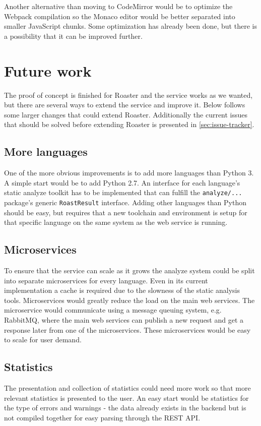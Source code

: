 \documentclass[12pt,a4paper]{report}
\begin{document}
Another alternative than moving to CodeMirror would be to optimize the Webpack compilation so the Monaco editor would be better separated into smaller JavaScript chunks. Some optimization has already been done, but there is a possibility that it can be improved further.

\chapter{Future work}
\label{sec:future-work}
The proof of concept is finished for Roaster and the service works as we wanted, but there are several ways to extend the service and improve it. Below follows some larger changes that could extend Roaster. Additionally the current issues that should be solved before extending Roaster is presented in \autoref{sec:issue-tracker}.

\section{More languages}
One of the more obvious improvements is to add more languages than Python 3. A simple start would be to add Python 2.7. An interface for each language's static analyze toolkit has to be implemented that can fulfill the \texttt{analyze/...} package's generic \texttt{RoastResult} interface. Adding other languages than Python should be easy, but requires that a new toolchain and environment is setup for that specific language on the same system as the web service is running.

\section{Microservices}
To ensure that the service can scale as it grows the analyze system could be split into separate microservices for every language. Even in its current implementation a cache is required due to the slowness of the static analysis tools. Microservices would greatly reduce the load on the main web services. The microservice would communicate using a message queuing system, e.g. RabbitMQ, where the main web services can publish a new request and get a response later from one of the microservices. These microservices would be easy to scale for user demand.

\section{Statistics}
The presentation and collection of statistics could need more work so that more relevant statistics is presented to the user. An easy start would be statistics for the type of errors and warnings - the data already exists in the backend but is not compiled together for easy parsing through the REST API.
\end{document}
